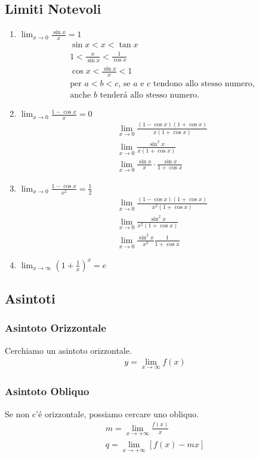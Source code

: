 \documentclass{article}
\begin{document}
\subsection{Limiti Notevoli}
\begin{enumerate}
    \item $\lim_{x\to0}\frac{\sin x}{x}=1$
    \begin{gather*}
        \sin x<x<\tan x\\
        1<\frac{x}{\sin x}<\frac{1}{\cos x}\\
        \cos x<\frac{\sin x}{x}<1\\
        \text{per $a<b<c$, se $a$ e $c$ tendono allo stesso numero,}\\
        \text{anche $b$ tenderá allo stesso numero.}
    \end{gather*}
    \item $\lim_{x\to 0}\frac{1-\cos x}{x}=0$
    \begin{gather*}
        \lim_{x\to 0}\frac{(1-\cos x)(1+\cos x)}{x(1+\cos x)}\\
        \lim_{x\to 0}\frac{\sin^2x}{x(1+\cos x)}\\
        \lim_{x\to 0}\frac{\sin x}{x}\cdot\frac{\sin x}{1+\cos x}
    \end{gather*}
    \item $\lim_{x\to 0}\frac{1-\cos x}{x^2}=\frac{1}{2}$
    \begin{gather*}
        \lim_{x\to 0}\frac{(1-\cos x)(1+\cos x)}{x^2(1+\cos x)}\\
        \lim_{x\to 0}\frac{\sin^2x}{x^2(1+\cos x)}\\
        \lim_{x\to 0}\frac{\sin^2 x}{x^2}\frac{1}{1+\cos x}
    \end{gather*}
\item $\lim_{x\to\infty}\left(1+\frac{1}{x}\right)^x=e$
\end{enumerate}
\subsection{Asintoti}
\subsubsection{Asintoto Orizzontale}
Cerchiamo un asintoto orizzontale.
\begin{gather*}
    y=\lim_{x\to\infty}f(x)
\end{gather*}
\subsubsection{Asintoto Obliquo}
Se non c'é orizzontale, possiamo cercare uno obliquo.
\begin{gather*}
    m= \lim_{x\to +\infty}\frac{f(x)}{x}\\
    q=\lim_{x \to +\infty}[f(x)-mx]
\end{gather*}
\end{document}

